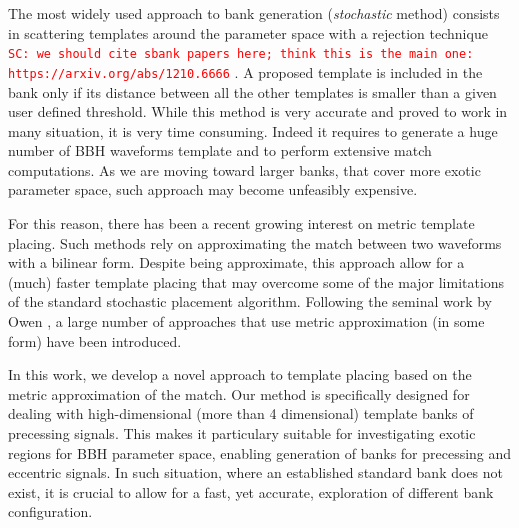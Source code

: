 \documentclass[twocolumn,showpacs,preprintnumbers,nofootinbib,prd,
superscriptaddress,10pt]{revtex4-1}
\newcommand{\sarah}[1]{{\textcolor{red}{\texttt{SC: #1}} }}
\begin{document}
The most widely used approach to bank generation ({\it stochastic} method) consists in scattering templates around the parameter space with a rejection technique \sarah{we should cite sbank papers here; think this is the main one: https://arxiv.org/abs/1210.6666}. A proposed template is included in the bank only if its distance between all the other templates is smaller than a given user defined threshold. While this method is very accurate and proved to work in many situation, it is very time consuming. Indeed it requires to generate a huge number of BBH waveforms template and to perform extensive match computations.
As we are moving toward larger banks, that cover more exotic parameter space, such approach may become unfeasibly expensive.

For this reason, there has been a recent growing interest on metric template placing. Such methods rely on approximating the match between two waveforms with a bilinear form. Despite being approximate, this approach allow for a (much) faster template placing that may overcome some of the major limitations of the standard stochastic placement algorithm.
Following the seminal work by Owen \cite{owen_metric}, a large number of approaches that use metric approximation (in some form) have been introduced.

In this work, we develop a novel approach to template placing based on the metric approximation of the match.
Our method is specifically designed for dealing with high-dimensional (more than 4 dimensional) template banks of precessing signals. This makes it particulary suitable for investigating exotic regions for BBH parameter space, enabling generation of banks for precessing and eccentric signals. In such situation, where an established standard bank does not exist, it is crucial to allow for a fast, yet accurate, exploration of different bank configuration.
\end{document}

